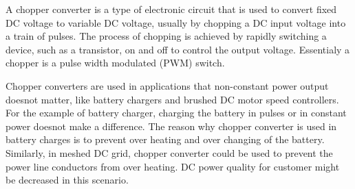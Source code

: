 A chopper converter is a type of electronic circuit that is used to convert fixed DC voltage to variable DC voltage, usually by chopping a DC input voltage into a train of pulses. The process of chopping is achieved by rapidly switching a device, such as a transistor, on and off to control the output voltage. Essentialy a chopper is a pulse width modulated (PWM) switch.

Chopper converters are used in applications that non-constant power output doesnot  matter, like battery chargers and brushed DC motor speed controllers. For the example of battery charger, charging the battery in pulses or in constant power doesnot make a difference. The reason why chopper converter is used in battery charges is to prevent over heating and over changing of the battery. Similarly, in meshed DC grid, chopper converter could be used to prevent the power line conductors from over heating. DC power quality for customer might be decreased in this scenario.

\begin{comment}

additional sources
https://en.wikipedia.org/wiki/Chopper_(electronics)
"Power Electronics: Converters, Applications, and Design" by Ned Mohan, Tore M. Undeland, William P. Robbins.
"Pulse Width Modulation for Power Converters: Principles and Practice" by Paul C. C. Hwang
"Switching Power Converters: Design and Analysis" by Khalid Sheikh.

\end{comment}